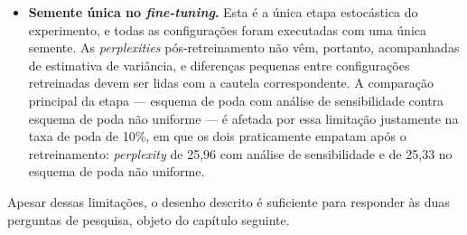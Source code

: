 \begin{itemize}

    \item \textbf{Semente única no \textit{fine-tuning}.} Esta é a única etapa estocástica
          do experimento, e todas as configurações foram executadas com uma única semente.
          As \textit{perplexities} pós-retreinamento não vêm, portanto, acompanhadas de
          estimativa de variância, e diferenças pequenas entre configurações retreinadas
          devem ser lidas com a cautela correspondente. A comparação principal da etapa
          --- esquema de poda com análise de sensibilidade contra esquema de poda não uniforme --- é afetada
          por essa limitação justamente na taxa de poda de 10\%, em que os dois praticamente
          empatam após o retreinamento: \textit{perplexity} de 25,96 com análise de
          sensibilidade e de 25,33 no esquema de poda não uniforme.

\end{itemize}

Apesar dessas limitações, o desenho descrito é suficiente para responder às duas perguntas
de pesquisa, objeto do capítulo seguinte.
